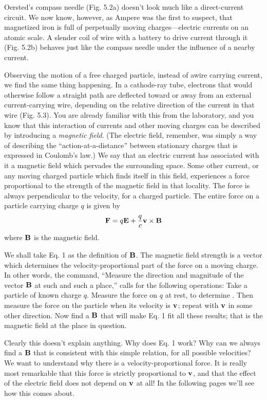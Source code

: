  
Oersted's compass needle (Fig. 5.2a) doesn't look much like a
direct-current circuit. We now know, however, as Ampere was the
first to suspect, that magnetized iron is full of perpetually moving
charges---electric currents on an atomic scale. A slender coil of wire
with a battery to drive current through it (Fig. 5.2b) behaves just
like the compass needle under the influence of a nearby current.

Observing the motion of a free charged particle, instead of awire
carrying current, we find the same thing happening. In a cathode-ray
tube, electrons that would otherwise follow a straight path are 
deflected toward or away from an external current-carrying wire, depending
on the relative direction of the current in that wire (Fig. 5.3).
You are already familiar with this from the laboratory, and you know
that this interaction of currents and other moving charges can be
described by introducing a \emph{magnetic field}. (The electric field,
remember, was simply a way of describing the ``action-at-a-distance''
between stationary charges that is expressed in Coulomb's law.)
We say that an electric current has associated with it a magnetic field
which pervades the surrounding space. Some other current, or any
moving charged particle which finds itself in this field, experiences a
force proportional to the strength of the magnetic field in that
locality. The force is always perpendicular to the velocity, for a
charged particle. The entire force on a particle carrying charge $q$ is
given by
\begin{equation}
  \mathbf{F} = q\mathbf{E} + \frac{q}{c}\mathbf{v}\times\mathbf{B}
\end{equation}
where $\mathbf{B}$ is the magnetic field.

We shall take Eq. 1 as the definition of $\mathbf{B}$. The magnetic field
strength is a vector which determines the velocity-proportional part
of the force on a moving charge. In other words, the command,
``Measure the direction and magnitude of the vector $\mathbf{B}$ at such and
such a place,'' calls for the following operations: Take a particle of
known charge $q$. Measure the force on $q$ at rest, to determine .
Then measure the force on the particle when its velocity is $\mathbf{v}$; repeat
with $\mathbf{v}$ in some other direction. Now find a $\mathbf{B}$ that will make Eq. 1
fit all these results; that is the magnetic field at the place in question.

Clearly this doesn't explain anything. Why does Eq. 1 work?
Why can we always find a $\mathbf{B}$ that is consistent with this simple 
relation, for all possible velocities? We want to understand why there
is a velocity-proportional force. It is really most remarkable that
this force is strictly proportional to $\mathbf{v}$, and that the effect of the electric
field does not depend on $\mathbf{v}$ at all! In the following pages we'll see
how this comes about.

